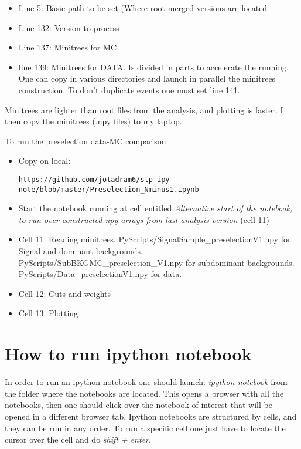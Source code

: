 \documentclass[11pt,a4paper]{article}
\begin{document}
\begin{itemize}
\item Line 5: Basic path to be set (Where root merged versions are located
\item Line 132: Version to process
\item Line 137: Minitrees for MC
\item line 139: Minitrees for DATA. Is divided in parts to accelerate the running. One can copy in various directories and launch in parallel the minitrees construction. To don't duplicate events one must set line 141.
\end{itemize}

Minitrees are lighter than root files from the analysis, and plotting is faster. I then copy the minitrees (.npy files) to my laptop.

To run the preselection data-MC comparison:
\begin{itemize}
\item Copy on local:
\begin{verbatim}
https://github.com/jotadram6/stp-ipy-note/blob/master/Preselection_Nminus1.ipynb
\end{verbatim}
\item Start the notebook running at cell entitled \textit{Alternative start of the notebook, to run over constructed npy arrays from last analysis version} (cell 11)
\item Cell 11: Reading minitrees. PyScripts/SignalSample\_preselectionV1.npy for Signal and dominant backgrounds. PyScripts/SubBKGMC\_preselection\_V1.npy for subdominant backgrounds. PyScripts/Data\_preselectionV1.npy for data. 
\item Cell 12: Cuts and weights
\item Cell 13: Plotting
\end{itemize}

\section*{How to run ipython notebook}

In order to run an ipython notebook one should launch: \textit{ipython notebook} from the folder where the notebooks are located. This opens a browser with all the notebooks, then one should click over the notebook of interest that will be opened in a different browser tab. Ipython notebooks are structured by cells, and they can be run in any order. To run a specific cell one just have to locate the cursor over the cell and do \textit{shift + enter}.  
\end{document}
